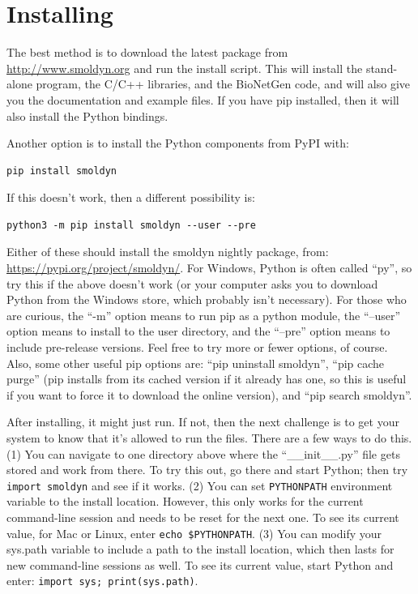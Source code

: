 \documentclass {scrbook}
\newcommand {\ttt} {\texttt}
\begin{document}
\section{Installing}

The best method is to download the latest package from \url{http://www.smoldyn.org} and run the install script. This will install the stand-alone program, the C/C++ libraries, and the BioNetGen code, and will also give you the documentation and example files. If you have pip installed, then it will also install the Python bindings.

Another option is to install the Python components from PyPI with:
\begin{lstlisting}[style=SSAC]
pip install smoldyn
\end{lstlisting}
If this doesn't work, then a different possibility is:
\begin{lstlisting}[style=SSAC]
python3 -m pip install smoldyn --user --pre
\end{lstlisting}
Either of these should install the smoldyn nightly package, from: \url{https://pypi.org/project/smoldyn/}. For Windows, Python is often called ``py'', so try this if the above doesn't work (or your computer asks you to download Python from the Windows store, which probably isn't necessary). For those who are curious, the ``-m'' option means to run pip as a python module, the ``--user'' option means to install to the user directory, and the ``--pre'' option means to include pre-release versions. Feel free to try more or fewer options, of course. Also, some other useful pip options are: ``pip uninstall smoldyn'', ``pip cache purge'' (pip installs from its cached version if it already has one, so this is useful if you want to force it to download the online version), and ``pip search smoldyn''.

After installing, it might just run. If not, then the next challenge is to get your system to know that it's allowed to run the files. There are a few ways to do this. (1) You can navigate to one directory above where the ``\_\_init\_\_.py'' file gets stored and work from there. To try this out, go there and start Python; then try \ttt{import smoldyn} and see if it works. (2) You can set \ttt{PYTHONPATH} environment variable to the install location. However, this only works for the current command-line session and needs to be reset for the next one. To see its current value, for Mac or Linux, enter \ttt{echo \$PYTHONPATH}. (3) You can modify your sys.path variable to include a path to the install location, which then lasts for new command-line sessions as well. To see its current value, start Python and enter: \ttt{import sys; print(sys.path)}.
\end{document}
